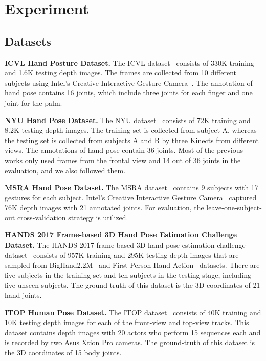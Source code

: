 \section{Experiment}

\subsection{Datasets}
{\bf ICVL Hand Posture Dataset.} 
The ICVL dataset~\cite{tang2014latent} consists of 330K training and 1.6K testing depth images. The frames are collected from 10 different subjects using Intel's Creative Interactive Gesture Camera~\cite{melax2013dynamics}. The annotation of hand pose contains 16 joints, which include three joints for each finger and one joint for the palm.

{\bf NYU Hand Pose Dataset.}
The NYU dataset~\cite{tompson2014real} consists of 72K training and 8.2K testing depth images. The training set is collected from subject A, whereas the testing set is collected from subjects A and B by three Kinects from different views. The annotations of hand pose contain 36 joints. Most of the previous works only used frames from the frontal view and 14 out of 36 joints in the evaluation, and we also followed them.

{\bf MSRA Hand Pose Dataset.}
The MSRA dataset~\cite{sun2015cascaded} contains 9 subjects with 17 gestures for each subject. Intel's Creative Interactive Gesture Camera~\cite{melax2013dynamics} captured 76K depth images with 21 annotated joints. For evaluation, the leave-one-subject-out cross-validation strategy is utilized. 

{\bf HANDS 2017 Frame-based 3D Hand Pose Estimation Challenge Dataset.}
The HANDS 2017 frame-based 3D hand pose estimation challenge dataset~\cite{yuan20172017} consists of 957K training and 295K testing depth images that are sampled from BigHand2.2M~\cite{Yuan_2017_CVPR} and First-Person Hand Action~\cite{garcia2017first} datasets. There are five subjects in the training set and ten subjects in the testing stage, including five unseen subjects. The ground-truth of this dataset is the 3D coordinates of 21 hand joints.

{\bf ITOP Human Pose Dataset.}
The ITOP dataset~\cite{haque2016towards} consists of 40K training and 10K testing depth images for each of the front-view and top-view tracks. This dataset contains depth images with 20 actors who perform 15 sequences each and is recorded by two Asus Xtion Pro cameras. The ground-truth of this dataset is the 3D coordinates of 15 body joints.


